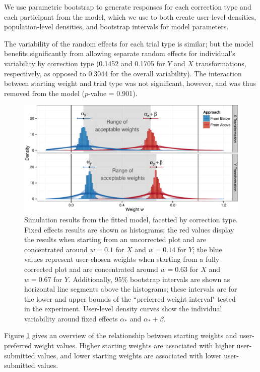 \documentclass[11pt]{isuthesis}\usepackage[]{graphicx}\usepackage[]{color}
\begin{document}
We use parametric bootstrap to generate responses for each correction type and each participant from the model, which we use to both  create user-level densities, population-level densities, and bootstrap intervals for model parameters. 


The variability of the random effects for each trial type is similar; but the model benefits significantly from allowing separate random effects for individual's variability by correction type (0.1452 and 0.1705 for $Y$ and $X$ transformations, respectively, as opposed to 0.3044 for the overall variability). The interaction between starting weight and trial type was not significant, however, and was thus removed from the model ($p$-value = 0.901).

\begin{figure}[hbtp]
\centering
\includegraphics[keepaspectratio=TRUE, width=.85\textwidth]{fig-results-analysis1}
\caption[Results from mixed model]{Simulation results from the fitted model, facetted by correction type. Fixed effects results are shown as histograms; the red values display the results when starting from an uncorrected plot and are concentrated around $w=0.1$ for $X$ and $w=0.14$ for $Y$; the blue values represent user-chosen weights when starting from a fully corrected plot and are concentrated around $w=0.63$ for $X$ and $w=0.67$ for $Y$. Additionally, 95\% bootstrap intervals are shown as horizontal line segments above the histograms; these intervals are for the lower and upper bounds of the ``preferred weight interval" tested in the experiment. User-level density curves show the individual variability around  fixed effects $\alpha_*$ and $\alpha_*+\beta$.}\label{fig:MixedModelResults}
\end{figure}
Figure \ref{fig:MixedModelResults} gives an overview of the relationship between starting weights and  user-preferred weight values. Higher starting weights are associated with higher user-submitted values, and lower starting weights are associated with lower user-submitted values.
\end{document}
